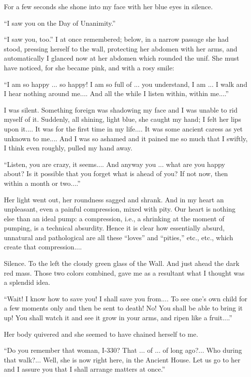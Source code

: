 \documentclass[11pt,openany]{book}
\begin{document}
For a few seconds she shone into my face with her blue eyes in silence.

``I saw you on the Day of Unanimity.''

``I saw you, too.'' I at once remembered; below, in a narrow passage she had stood, pressing herself to the wall, protecting her abdomen with her arms, and automatically I glanced now at her abdomen which rounded the unif. She must have noticed, for she became pink, and with a rosy smile:

``I am so happy ... so happy! I am so full of ... you understand, I am ... I walk and I hear nothing around me.... And all the while I listen within, within me....''

I was silent. Something foreign was shadowing my face and I was unable to rid myself of it. Suddenly, all shining, light blue, she caught my hand; I felt her lips upon it.... It was for the first time in my life.... It was some ancient caress as yet unknown to me.... And I was so ashamed and it pained me so much that I swiftly, I think even roughly, pulled my hand away.

``Listen, you are crazy, it seems.... And anyway you ... what are you happy about? Is it possible that you forget what is ahead of you? If not now, then within a month or two....''

Her light went out, her roundness sagged and shrank. And in my heart an unpleasant, even a painful compression, mixed with pity. Our heart is nothing else than an ideal pump: a compression, i.e., a shrinking at the moment of pumping, is a technical absurdity. Hence it is clear how essentially absurd, unnatural and pathological are all these ``loves'' and ``pities,'' etc., etc., which create that compression....

Silence. To the left the cloudy green glass of the Wall. And just ahead the dark red mass. Those two colors combined, gave me as a resultant what I thought was a splendid idea.

``Wait! I know how to save you! I shall save you from.... To see one's own child for a few moments only and then be sent to death! No! You shall be able to bring it up! You shall watch it and see it grow in your arms, and ripen like a fruit....''

Her body quivered and she seemed to have chained herself to me.

``Do you remember that woman, I-330? That ... of ... of long ago?... Who during that walk?... Well, she is now right here, in the Ancient House. Let us go to her and I assure you that I shall arrange matters at once.''
\end{document}
